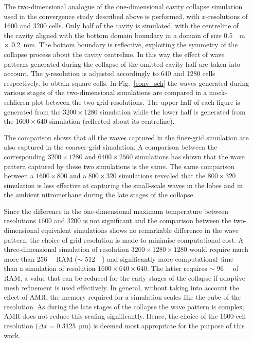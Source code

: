\documentclass[3p,times,twocolumn]{elsarticle}
\begin{document}
The two-dimensional analogue of the one-dimensional cavity collapse simulation
used in the convergence study described above is performed, with $x$-resolutions
of  1600 and 3200 cells.  Only half of the cavity is simulated, with the centreline of the cavity
aligned with the bottom domain boundary in a domain of size  \SI{0.5}{\milli
\meter}$\times$ \SI{0.2}{\milli \meter}. The bottom boundary is reflective,
exploiting the symmetry of the collapse process about the cavity centreline.
In this way the effect of wave patterns generated during the collapse of
the omitted cavity half are taken into account. The $y$-resolution is adjusted
accordingly to 640 and 1280 cells respectively, to obtain square cells. In Fig.\  \ref{conv_sch}
the waves generated during various stages of the two-dimensional simulations
are compared in a mock-schlieren plot between the two grid resolutions. The upper half of each figure
is generated from the $3200\times1280$ simulation while the lower half is
generated from the $1600\times640$ simulation (reflected about its centreline).


 The comparison shows that all the waves captured in the finer-grid simulation
are also captured in the coarser-grid simulation. A comparison between the
corresponding $3200\times1280$ and $6400\times2560$ simulations has shown
that the wave pattern captured by these two simulations is the same. The
same comparison between a $1600\times800$ and a $800\times320$ simulations
revealed that the $800\times320$ simulation is less effective at capturing
the small-scale waves in the lobes and in the ambient nitromethane during
the late stages of the collapse. 

Since the difference in the one-dimensional maximum temperature between resolutions
$1600$ and $3200$ is not significant and the comparison between the two-dimensional
equivalent simulations shows no remarkable difference in the wave pattern,
the choice of grid resolution is made to minimise computational cost. A three-dimensional
simulation of resolution $3200\times1280\times1280$ would require much more
than  \SI{256}{\giga \byte} RAM ($\sim$ \SI{512}{\giga \byte})
 and significantly more computational time than a simulation of resolution
$1600\times640\times640$. The latter requires $\sim$ \SI{96}{\giga \byte} of RAM,
a value that can be reduced for the early stages of the collapse if adaptive
mesh refinement is used effectively.
 In general, without taking into account the effect of AMR, the memory required
for a simulation scales like the cube of the resolution.  As during the late
stages of the collapse the wave pattern is complex, AMR does not reduce
this scaling significantly. Hence, the choice of the $1600$-cell resolution
($\Delta x=$\SI{0.3125}{\micro \meter}) is deemed most appropriate for the
purpose of this work.
\end{document}

